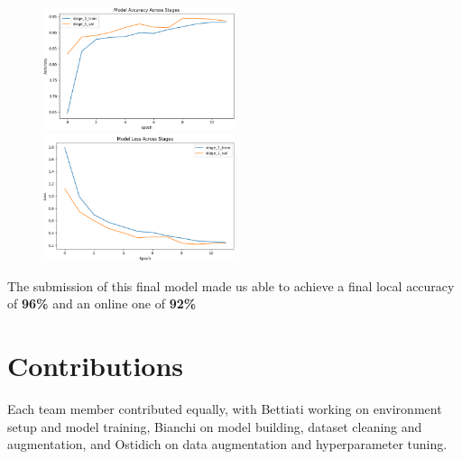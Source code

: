 \documentclass[11pt]{article}
\begin{document}
\begin{multicols}{2}
        \begin{figure}[h!]
            \centering
            \small
            \includegraphics[width=0.5\textwidth]{images/final_accuracy.png}
            \includegraphics[width=0.5\textwidth]
            {images/final_loss.png}
        \end{figure}
        
        The submission of this final model made us able to achieve a final local accuracy of \textbf{96\%} and an online one of \textbf{92\%}
        
        \section{Contributions}
        Each team member contributed equally, with Bettiati working on environment setup and model training, Bianchi on model building, dataset cleaning and augmentation, and Ostidich on data augmentation and hyperparameter tuning.

        
        
        
    \end{multicols}
\end{document}
